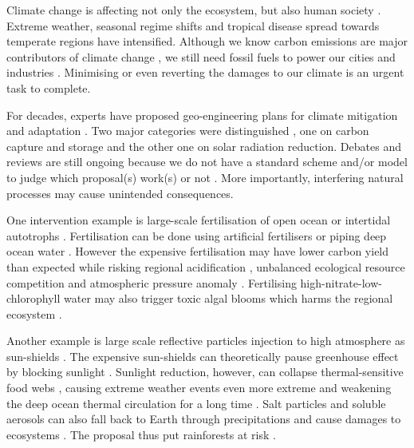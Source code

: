 \documentclass[../thesis.tex]{subfiles} %
\begin{document}
Climate change is affecting not only the ecosystem, but also human society \autocite{notz2016observed,schuur2015climate}.  Extreme weather, seasonal regime shifts and tropical disease spread towards temperate regions have intensified.  Although we know carbon emissions are major contributors of climate change \autocite{notz2016observed}, we still need fossil fuels to power our cities and industries \autocite{ferguson2000electricity}.  Minimising or even reverting the damages to our climate is an urgent task to complete.

For decades, experts have proposed geo-engineering plans for climate mitigation and adaptation \autocite{farrelly2013carbon,yang2008progress,boyd2008ranking,boettcher2019high,vaughan2011review}.  Two major categories were distinguished \autocite{boyd2008ranking}, one on carbon capture and storage and the other one on solar radiation reduction.  Debates and reviews are still ongoing because we do not have a standard scheme and/or model to judge which proposal(s) work(s) or not \autocite{boyd2008ranking,boettcher2019high,boyd2016development,oschlies2017indicators,gattuso2018ocean}.  More importantly, interfering natural processes may cause unintended consequences.

One intervention example is large-scale fertilisation of open ocean \autocite{gnanadesikan2008export,lovelock2007ocean,lawrence2014efficiency} or intertidal autotrophs \autocite{duarte2017can,johannessen2016geoengineering,krause2016substantial}.  Fertilisation can be done using artificial fertilisers \autocite{gnanadesikan2008export,lawrence2014efficiency,trick2010iron} or piping deep ocean water \autocite{kwiatkowski2015atmospheric,lovelock2007ocean}.  However the expensive fertilisation may have lower carbon yield than expected \autocite{boyd2008implications,gnanadesikan2008export,oschlies2010side} while risking regional acidification \autocite{oschlies2010side}, unbalanced ecological resource competition \autocite{chung2011using,thiele2012microbial,batten2014did} and atmospheric pressure anomaly \autocite{kwiatkowski2015atmospheric}.  Fertilising high-nitrate-low-chlorophyll water may also trigger toxic algal blooms which harms the regional ecosystem \autocite{trick2010iron}.

Another example is large scale reflective particles injection to high atmosphere as sun-shields \autocite{latham2008global,stjern2018response,xia2016stratospheric}.  The expensive sun-shields \autocite{boyd2008implications} can theoretically pause greenhouse effect by blocking sunlight \autocite{williamson2012impacts}.  Sunlight reduction, however, can collapse thermal-sensitive food webs \autocite{williamson2012impacts}, causing extreme weather events even more extreme \autocite{jones2009climate} and weakening the deep ocean thermal circulation for a long time \autocite{lauvset2017climate,williamson2012impacts}.  Salt particles and soluble aerosols can also fall back to Earth through precipitations and cause damages to ecosystems \autocite{bala2011albedo}.  The proposal thus put rainforests at risk \autocite{muri2015tropical}.
\end{document}
